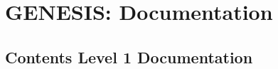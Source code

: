 \documentclass[12pt]{article}
\begin{document}
\section*{GENESIS: Documentation}

\subsection*{Contents Level 1 Documentation}

\end{document}
